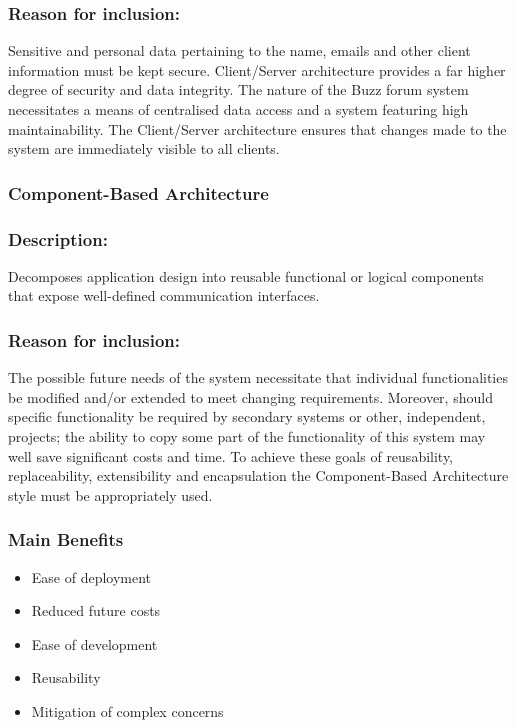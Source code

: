 	\subsubsection*{Reason for inclusion:}
		Sensitive and personal data pertaining to the name, emails and other client information must be kept secure. Client/Server architecture provides a far higher degree of security and data integrity.
		The nature of the Buzz forum system necessitates a means of centralised data access and a system featuring high maintainability. The Client/Server architecture ensures that changes made to the system are immediately visible to all clients. 
		
		\subsubsection{Component-Based Architecture}
		\subsubsection*{Description:}
			Decomposes application design into reusable functional or logical components that expose well-defined communication interfaces.
				
		\subsubsection*{Reason for inclusion:}
			The possible future needs of the system necessitate that individual functionalities be modified and/or extended to meet changing requirements. Moreover, should specific functionality be required by secondary systems or other, independent, projects; the ability to copy some part of the functionality of this system may well save significant costs and time. To achieve these goals of reusability, replaceability, extensibility and encapsulation the Component-Based Architecture style must be appropriately used.
			
			\subsubsection*{Main Benefits}
			\begin{itemize}
				\item Ease of deployment
				\item Reduced future costs
				\item Ease of development
				\item Reusability
				\item Mitigation of complex concerns
			\end{itemize}
		
